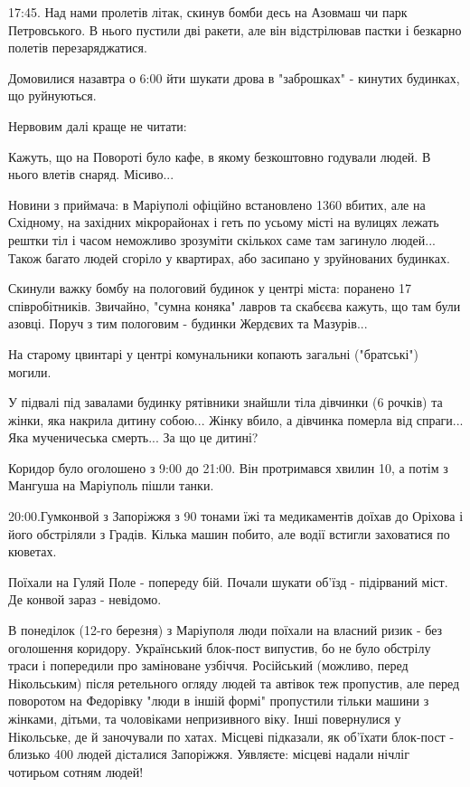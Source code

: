 
17:45. Над нами пролетів літак, скинув бомби десь на Азовмаш чи парк
Петровського. В нього пустили дві ракети, але він відстрілював пастки і
безкарно полетів перезаряджатися.

Домовилися назавтра о 6:00 йти шукати дрова в "заброшках" - кинутих будинках,
що руйнуються. 

Нервовим далі краще не читати:

Кажуть, що на Повороті було кафе, в якому безкоштовно годували людей. В нього
влетів снаряд. Місиво...

Новини з приймача: в Маріуполі офіційно встановлено 1360 вбитих, але на
Східному, на західних мікрорайонах і геть по усьому місті на вулицях лежать
рештки тіл і часом неможливо зрозуміти скількох саме там загинуло людей...
Також багато людей сгоріло у квартирах, або засипано у зруйнованих будинках.

Скинули важку бомбу на пологовий будинок у центрі міста: поранено 17
співробітників. Звичайно, "сумна коняка" лавров та скабєєва кажуть, що там були
азовці.  Поруч з тим пологовим - будинки Жердєвих та Мазурів...

На старому цвинтарі у центрі комунальники копають загальні ("братські") могили.

У підвалі під завалами будинку рятівники знайшли тіла дівчинки (6 рочків) та
жінки, яка накрила дитину собою... Жінку вбило, а дівчинка померла від
спраги... Яка мученичеська смерть... За що це дитині?

Коридор було оголошено з 9:00 до 21:00. Він протримався хвилин 10, а потім з
Мангуша на Маріуполь пішли танки.  

20:00.Гумконвой з Запоріжжя з 90 тонами їжі та медикаментів  доїхав до Оріхова
і його обстріляли з Градів. Кілька машин побито, але водії встигли заховатися
по кюветах.

Поїхали на Гуляй Поле - попереду бій. Почали шукати об'їзд - підірваний міст.
Де конвой зараз - невідомо.

В понеділок (12-го березня) з Маріуполя люди поїхали на власний ризик - без
оголошення коридору. Український блок-пост випустив, бо не було обстрілу траси
і попередили про заміноване узбіччя. Російський (можливо, перед Нікольським)
після ретельного огляду людей та автівок теж пропустив, але перед поворотом на
Федорівку "люди в іншій формі" пропустили тільки машини з жінками, дітьми, та
чоловіками непризивного віку. Інші повернулися у Нікольське, де й заночували по
хатах. Місцеві підказали, як об'їхати блок-пост - близько 400 людей дісталися
Запоріжжя. Уявляєте: місцеві надали нічліг чотирьом сотням людей!  

